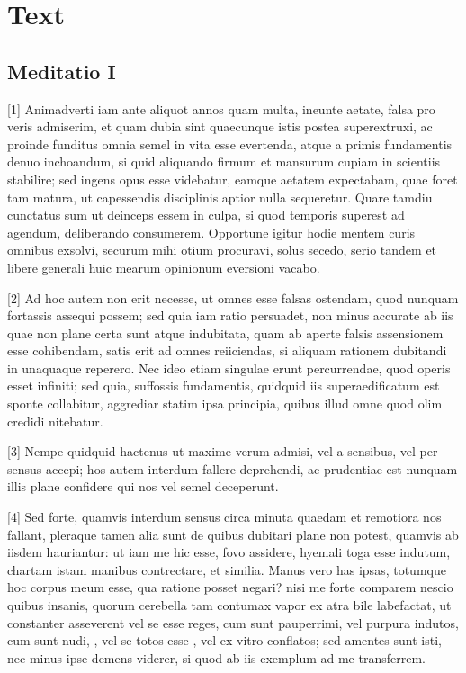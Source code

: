 \chapter*{Text}
\def\ind{%
    \hspace{2em}%
}

\section*{Meditatio I}

[1] Animadverti iam ante aliquot annos quam multa, ineunte aetate, falsa pro veris admiserim, et quam dubia sint quaecunque istis postea superextruxi, ac proinde funditus omnia semel in vita esse evertenda, atque a primis fundamentis denuo inchoandum, si quid aliquando firmum et mansurum cupiam in scientiis stabilire; sed ingens opus esse videbatur, eamque aetatem expectabam, quae foret tam matura, ut capessendis disciplinis aptior nulla sequeretur. Quare tamdiu cunctatus sum ut deinceps essem in culpa, si quod temporis superest ad agendum, deliberando consumerem. Opportune igitur hodie mentem curis omnibus exsolvi, securum mihi otium procuravi, solus secedo, serio tandem et libere generali huic mearum opinionum eversioni vacabo.

[2] Ad hoc autem non erit necesse, ut omnes esse falsas ostendam, quod nunquam fortassis assequi possem; sed quia iam ratio persuadet, non minus accurate ab iis quae non plane certa sunt atque indubitata, quam ab aperte falsis assensionem esse cohibendam, satis erit ad omnes reiiciendas, si aliquam rationem dubitandi in unaquaque reperero. Nec ideo etiam singulae erunt percurrendae, quod operis esset infiniti; sed quia, suffossis fundamentis, quidquid iis superaedificatum est sponte collabitur, aggrediar statim ipsa principia, quibus illud omne quod olim credidi nitebatur.

[3] Nempe quidquid hactenus ut maxime verum admisi, vel a sensibus, vel per sensus accepi; hos autem interdum fallere deprehendi, ac prudentiae est nunquam illis plane confidere qui nos vel semel deceperunt.

[4] Sed forte, quamvis interdum sensus circa minuta quaedam et remotiora nos fallant, pleraque tamen alia sunt de quibus dubitari plane non potest, quamvis ab iisdem hauriantur: ut iam me hic esse, fovo assidere, hyemali toga esse indutum, chartam istam manibus contrectare, et similia. Manus vero has ipsas, totumque hoc corpus meum esse, qua ratione posset negari? nisi me forte comparem nescio quibus insanis, quorum cerebella tam contumax vapor ex atra bile labefactat, ut constanter asseverent vel se esse reges, cum sunt pauperrimi, vel purpura indutos, cum sunt nudi, , vel se totos esse , vel ex vitro conflatos; sed amentes sunt isti, nec minus ipse demens viderer, si quod ab iis exemplum ad me transferrem.

